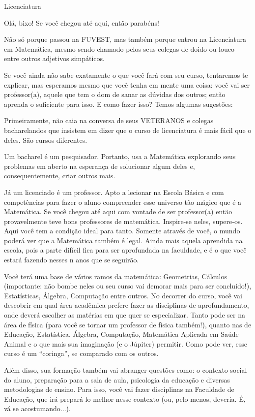 \begin{subsecao}{Licenciatura}

Olá, bixo! Se você chegou até aqui, então parabéns!

Não só porque passou na FUVEST, mas também porque entrou na Licenciatura em
Matemática, mesmo sendo chamado pelos seus colegas de doido ou louco entre
outros adjetivos simpáticos.

Se você ainda não sabe exatamente o que você fará com seu curso, tentaremos
te explicar, mas esperamos mesmo que você tenha em mente uma coisa: você vai ser
professor(a), aquele que tem o dom de sanar as dúvidas dos outros; então
aprenda o suficiente para isso. E como fazer isso? Temos algumas sugestões:

Primeiramente, não caia na conversa de seus VETERANOS e colegas bacharelandos
que insistem em dizer que o curso de licenciatura é mais fácil que o deles. São
cursos diferentes.

Um bacharel é um pesquisador. Portanto, usa a Matemática explorando seus
problemas em aberto na esperança de solucionar algum deles e, consequentemente,
criar outros mais.

Já um licenciado é um professor. Apto a lecionar na Escola Básica e com
competências para fazer o aluno compreender esse universo tão mágico que é a
Matemática. Se você chegou até aqui com vontade de ser professor(a) então
provavelmente teve bons professores de matemática. Inspire-se neles, supere-os.
Aqui você tem a condição ideal para tanto. Somente através de você, o mundo
poderá ver que a Matemática também é legal. Ainda mais aquela aprendida na
escola, pois a parte difícil fica para ser aprofundada na faculdade, e é o que
você estará fazendo nesses n anos que se seguirão.

Você terá uma base de vários ramos da matemática: Geometrias,
Cálculos (importante: não bombe neles ou seu curso vai demorar mais para ser
concluído!), Estatísticas, Álgebra, Computação entre outros. No decorrer do
curso, você vai descobrir em qual área acadêmica prefere fazer as disciplinas de
aprofundamento, onde deverá escolher as matérias em que quer se
especializar. Tanto pode ser na área de física (para você se tornar um
professor de física também!), quanto nas de Educação, Estatística, Álgebra,
Computação, Matemática Aplicada em Saúde Animal e o que mais sua
imaginação (e o Júpiter) permitir. Como pode ver, esse curso é um ``coringa'', se
comparado com os outros.

Além disso, sua formação também vai abranger questões como: o contexto social do
aluno, preparação para a sala de aula, psicologia da educação e diversas
metodologias de ensino. Para isso, você vai fazer disciplinas na Faculdade de
Educação, que irá prepará-lo melhor nesse contexto (ou, pelo menos, deveria. É,
vá se acostumando...).


\end{subsecao}
